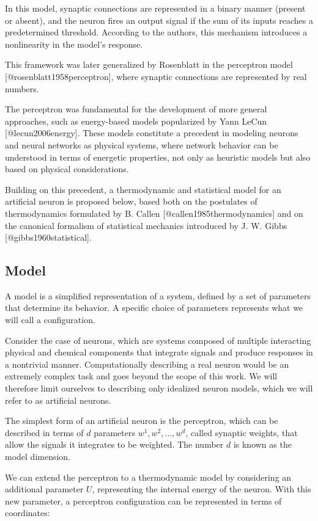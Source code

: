 \documentclass[12pt]{article}
\begin{document}
In this model, synaptic connections are represented in a binary manner (present or absent), and the neuron fires an output signal if the sum of its inputs reaches a predetermined threshold. According to the authors, this mechanism introduces a nonlinearity in the model's response.

This framework was later generalized by Rosenblatt in the perceptron model [@rosenblatt1958perceptron], where synaptic connections are represented by real numbers.

The perceptron was fundamental for the development of more general approaches, such as energy-based models popularized by Yann LeCun [@lecun2006energy]. These models constitute a precedent in modeling neurons and neural networks as physical systems, where network behavior can be understood in terms of energetic properties, not only as heuristic models but also based on physical considerations.

Building on this precedent, a thermodynamic and statistical model for an artificial neuron is proposed below, based both on the postulates of thermodynamics formulated by B. Callen [@callen1985thermodynamics] and on the canonical formalism of statistical mechanics introduced by J. W. Gibbs [@gibbs1960statistical].

\subsection{Model}

A model is a simplified representation of a system, defined by a set of parameters that determine its behavior. A specific choice of parameters represents what we will call a configuration.

Consider the case of neurons, which are systems composed of multiple interacting physical and chemical components that integrate signals and produce responses in a nontrivial manner. Computationally describing a real neuron would be an extremely complex task and goes beyond the scope of this work. We will therefore limit ourselves to describing only idealized neuron models, which we will refer to as artificial neurons.

The simplest form of an artificial neuron is the perceptron, which can be described in terms of $d$ parameters $w^1, w^2, ..., w^d$, called synaptic weights, that allow the signals it integrates to be weighted. The number $d$ is known as the model dimension.

We can extend the perceptron to a thermodynamic model by considering an additional parameter $U$, representing the internal energy of the neuron. With this new parameter, a perceptron configuration can be represented in terms of coordinates:
\end{document}
